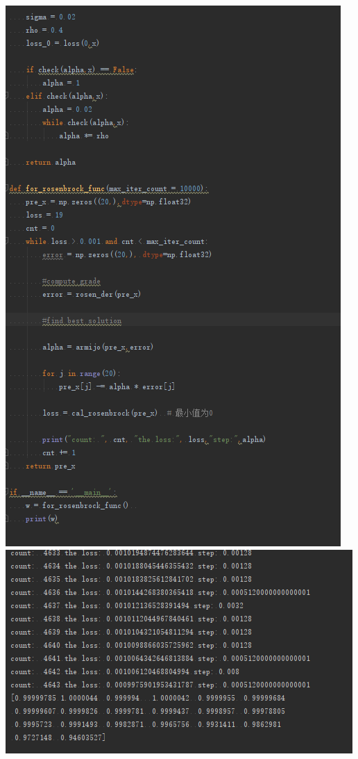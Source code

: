 \documentclass{article}
\begin{document}
\includegraphics[scale=0.6]{1590807235(1).png}
\includegraphics[scale=0.6]{1590807273(1).png}
\end{document}
